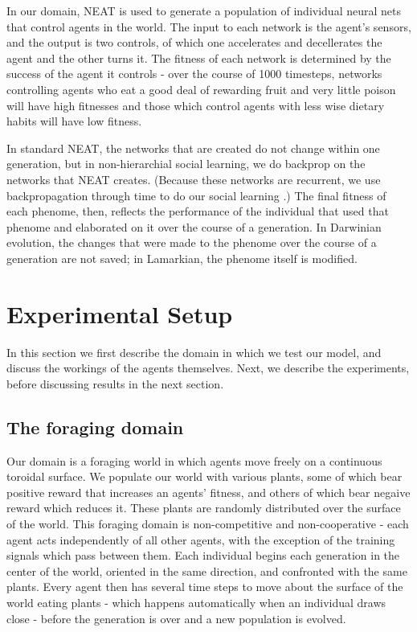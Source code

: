 \documentclass{acm_proc_article-sp}
\begin{document}
In our domain, NEAT is used to generate a population of individual neural nets that control agents in the world.  The input to each network is the agent's sensors, and the output is two controls, of which one accelerates and decellerates the agent and the other turns it.  The fitness of each network is determined by the success of the agent it controls - over the course of 1000 timesteps, networks controlling agents who eat a good deal of rewarding fruit and very little poison will have high fitnesses and those which control agents with less wise dietary habits will have low fitness.

In standard NEAT, the networks that are created do not change within one generation, but in non-hierarchial social learning, we do backprop on the networks that NEAT creates. (Because these networks are recurrent, we use backpropagation through time to do our social learning \cite{werbos1990backpropagation}.)  The final fitness of each phenome, then, reflects the performance of the individual that used that phenome and elaborated on it over the course of a generation. In Darwinian evolution, the changes that were made to the phenome over the course of a generation are not saved; in Lamarkian, the phenome itself is modified.

\section{Experimental Setup}
\label{sec:setup}
In this section we first describe the domain in which we test our model, and discuss the workings of the agents themselves.  Next, we describe the experiments, before discussing results in the next section.
\subsection*{The foraging domain} 
    Our domain is a foraging world in which agents move freely on a continuous toroidal surface.  We populate our world with various plants, some of which bear positive reward that increases an agents' fitness, and others of which bear negaive reward which reduces it. These plants are randomly distributed over the surface of the world. This foraging domain is non-competitive and non-cooperative - each agent acts independently of all other agents, with the exception of the training signals which pass between them. Each individual begins each generation in the center of the world, oriented in the same direction, and confronted with the same plants. Every agent then has several time steps to move about the surface of the world eating plants - which happens automatically when an individual draws close - before the generation is over and a new population is evolved. 
    
\end{document}
